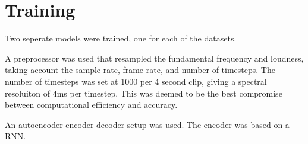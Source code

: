 \section{Training}

Two seperate models were trained, one for each of the datasets.

A preprocessor was used that resampled the fundamental frequency and loudness, taking account the sample rate, frame rate, and number of timesteps. The number of timesteps was set at 1000 per 4 second clip, giving a spectral resoluiton of 4ms per timestep. This was deemed to be the best compromise between computational efficiency and accuracy.

An autoencoder encoder decoder setup was used. The encoder was based on a \acrfull{RNN}.